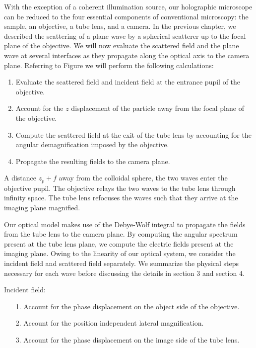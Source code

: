 With the exception of a coherent illumination source, our holographic microscope
can be reduced to the four essential components of conventional microscopy: the sample,
an objective, a tube lens, and a camera. In the previous chapter, we described the
scattering of a plane wave by a spherical scatterer up to the focal plane
of the objective. We will now evaluate the scattered field and the plane
wave at several interfaces as they propagate along the optical axis to the
camera plane.
Referring to Figure %
we will perform the following calculations:
\begin{enumerate}
\item Evaluate the scattered field and incident field at the entrance pupil of the
  objective.
\item Account for the  $z$ displacement of the particle away from the focal
  plane of the objective.
\item Compute the scattered field at the exit of the tube lens by accounting
  for the angular demagnification imposed by the objective.
\item Propagate the resulting fields to the camera plane.
\end{enumerate}

A distance $z_p + f$ away from the colloidal sphere, the two waves enter the
objective pupil. The objective relays the two waves to the tube lens through
infinity space. The tube lens refocuses the waves such that they arrive at the imaging
plane magnified.

Our optical model makes use of the Debye-Wolf integral to propagate the
fields from the tube lens to the camera plane. By computing the
angular spectrum present at the tube lens plane, we compute the electric fields
present at the imaging plane. Owing to the linearity of our optical system,
we consider the incident field and scattered field separately. We summarize the physical
steps necessary for each wave before discussing the details in section 3 and section 4.

Incident field:
\begin{enumerate}
\item[1.] Account for the phase displacement on the object side of the objective.
\item[2.] Account for the position independent lateral magnification.
\item[3.] Account for the phase displacement on the image side of the tube lens.
\end{enumerate}

